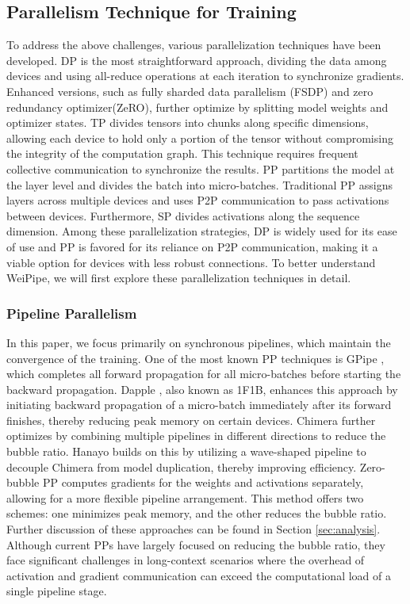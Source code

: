 \documentclass[sigplan,screen]{acmart}
\begin{document}
\subsection{Parallelism Technique for Training}
To address the above challenges, various parallelization techniques have been developed. DP is the most straightforward approach, dividing the data among devices and using all-reduce operations at each iteration to synchronize gradients. Enhanced versions, such as fully sharded data parallelism (FSDP) \cite{zhao2023pytorchfsdpexperiencesscaling} and zero redundancy optimizer(ZeRO)\cite{rajbhandari2020zeromemoryoptimizationstraining}, further optimize by splitting model weights and optimizer states. TP divides tensors into chunks along specific dimensions, allowing each device to hold only a portion of the tensor without compromising the integrity of the computation graph. This technique requires frequent collective communication to synchronize the results. PP partitions the model at the layer level and divides the batch into micro-batches. Traditional PP assigns layers across multiple devices and uses P2P communication to pass activations between devices. Furthermore, SP \cite{jacobs2023Ulysses, liu2023ring, gu2024loongtrainefficienttraininglongsequence, li2022sequence, liu2024wallfacerguidingtransformermodel} divides activations along the sequence dimension. Among these parallelization strategies, DP is widely used for its ease of use and PP is favored for its reliance on P2P communication, making it a viable option for devices with less robust connections. To better understand WeiPipe, we will first explore these parallelization techniques in detail.

\subsubsection{Pipeline Parallelism}

In this paper, we focus primarily on synchronous pipelines, which maintain the convergence of the training. One of the most known PP techniques is GPipe \cite{gpipe}, which completes all forward propagation for all micro-batches before starting the backward propagation. Dapple \cite{dapple}, also known as 1F1B, enhances this approach by initiating backward propagation of a micro-batch immediately after its forward finishes, thereby reducing peak memory on certain devices. Chimera \cite{li2021chimera} further optimizes by combining multiple pipelines in different directions to reduce the bubble ratio. Hanayo \cite{hanayo} builds on this by utilizing a wave-shaped pipeline to decouple Chimera from model duplication, thereby improving efficiency. Zero-bubble PP \cite{qi2023zerobubblepipelineparallelism} computes gradients for the weights and activations separately, allowing for a more flexible pipeline arrangement. This method offers two schemes: one minimizes peak memory, and the other reduces the bubble ratio. Further discussion of these approaches can be found in Section \ref{sec:analysis}. Although current PPs have largely focused on reducing the bubble ratio, they face significant challenges in long-context scenarios where the overhead of activation and gradient communication can exceed the computational load of a single pipeline stage.
\end{document}
